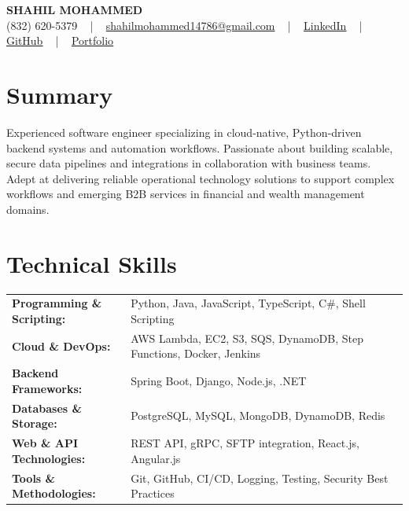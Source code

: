 \documentclass[letterpaper,11pt]{article}
\begin{document}
\begin{center}
    {\fontsize{14pt}{12pt}\selectfont \textbf{\MakeUppercase{Shahil Mohammed}}}\\ \vspace{2pt}
    \fontsize{10pt}{12pt}\selectfont (832) 620-5379 ~ | ~ \href{mailto:shahilmohammed14786@gmail.com}{shahilmohammed14786@gmail.com} ~ | ~  
    \href{https://www.linkedin.com/in/shahil-mohammed-9652931a1/}{\color{blue}\underline{LinkedIn}}  ~ | ~ 
    \href{https://github.com/freakbeast14}{\color{blue}\underline{GitHub}} ~ | ~ 
    \href{https://shahil-mohammed.netlify.app/}{\color{blue}\underline{Portfolio}}
    \vspace{-8pt}
\end{center}

\section{Summary}
\fontsize{9pt}{10pt}\selectfont
Experienced software engineer specializing in cloud-native, Python-driven backend systems and automation workflows. Passionate about building scalable, secure data pipelines and integrations in collaboration with business teams. Adept at delivering reliable operational technology solutions to support complex workflows and emerging B2B services in financial and wealth management domains.
 \vspace{-5pt}
 
\section{Technical Skills}
        \vspace{-14pt}
        \begin{table}[h]
            \fontsize{9pt}{10pt}\selectfont
            \begin{tabular}{p{0.3\linewidth} p{0.7\linewidth}}
                \textbf{Programming \& Scripting:} & Python, Java, JavaScript, TypeScript, C\#, Shell Scripting \\
                \textbf{Cloud \& DevOps:} & AWS Lambda, EC2, S3, SQS, DynamoDB, Step Functions, Docker, Jenkins \\
                \textbf{Backend Frameworks:} & Spring Boot, Django, Node.js, .NET \\
                \textbf{Databases \& Storage:} & PostgreSQL, MySQL, MongoDB, DynamoDB, Redis \\
                \textbf{Web \& API Technologies:} & REST API, gRPC, SFTP integration, React.js, Angular.js \\
                \textbf{Tools \& Methodologies:} & Git, GitHub, CI/CD, Logging, Testing, Security Best Practices \\
            \end{tabular}
        \end{table}
 \vspace{-15pt}
 
\end{document}
